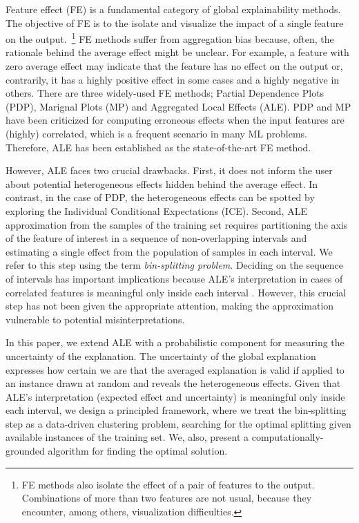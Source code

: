 \documentclass[twoside]{article}
\begin{document}
Feature effect (FE) \citep{Gromping2020MAEP} is a fundamental category
of global explainability methods. The objective of FE is to the
isolate and visualize the impact of a single feature on the
output.~\footnote{FE methods also isolate the effect of a pair of
  features to the output. Combinations of more than two features are
  not usual, because they encounter, among others, visualization
  difficulties.} FE methods suffer from aggregation bias because,
often, the rationale behind the average effect might be unclear. For
example, a feature with zero average effect may indicate that the
feature has no effect on the output or, contrarily, it has a highly
positive effect in some cases and a highly negative in others. There
are three widely-used FE methods; Partial Dependence Plots
(PDP)\citep{friedman2001greedy}, Marignal Plots
(MP)\citep{apley2020visualizing} and Aggregated Local Effects
(ALE)\citep{apley2020visualizing}. PDP and MP have been criticized for
computing erroneous effects when the input features are (highly)
correlated, which is a frequent scenario in many ML
problems. Therefore, ALE has been established as the state-of-the-art
FE method.

However, ALE faces two crucial drawbacks. First, it does not inform
the user about potential heterogeneous effects hidden behind the
average effect. In contrast, in the case of PDP, the heterogeneous
effects can be spotted by exploring the Individual Conditional
Expectations (ICE)\citep{goldstein2015peeking}. Second, ALE
approximation from the samples of the training set requires
partitioning the axis of the feature of interest in a sequence of
non-overlapping intervals and estimating a single effect from the
population of samples in each interval. We refer to this step using
the term \textit{bin-splitting problem}. Deciding on the sequence of
intervals has important implications because ALE's interpretation in
cases of correlated features is meaningful only inside each interval
\citep{molnar2022}. However, this crucial step has not been given the
appropriate attention, making the approximation vulnerable to
potential misinterpretations.

In this paper, we extend ALE with a probabilistic component for
measuring the uncertainty of the explanation. The uncertainty of the
global explanation expresses how certain we are that the averaged
explanation is valid if applied to an instance drawn at random and
reveals the heterogeneous effects. Given that ALE's interpretation
(expected effect and uncertainty) is meaningful only inside each
interval, we design a principled framework, where we treat the
bin-splitting step as a data-driven clustering problem, searching for
the optimal splitting given available instances of the training
set. We, also, present a computationally-grounded algorithm for
finding the optimal solution.
\end{document}
